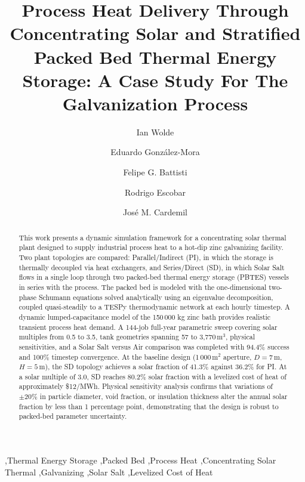 \documentclass[11pt,review,3p]{elsarticle}
\begin{document}
\begin{frontmatter}

\title{Process Heat Delivery Through Concentrating Solar and Stratified Packed Bed Thermal Energy Storage: A Case Study For The Galvanization Process}

\author[PUC]{Ian Wolde}
\author[UTFSM]{Eduardo González-Mora}
\author[UTEM]{Felipe G. Battisti}
\author[PUC]{Rodrigo Escobar}
\author[PUC,SERC,CDA]{José M. Cardemil}



\begin{abstract}
This work presents a dynamic simulation framework for a concentrating solar thermal plant designed to supply industrial process heat to a hot-dip zinc galvanizing facility. Two plant topologies are compared: Parallel/Indirect (PI), in which the storage is thermally decoupled via heat exchangers, and Series/Direct (SD), in which Solar Salt flows in a single loop through two packed-bed thermal energy storage (PBTES) vessels in series with the process. The packed bed is modeled with the one-dimensional two-phase Schumann equations solved analytically using an eigenvalue decomposition, coupled quasi-steadily to a TESPy thermodynamic network at each hourly timestep. A dynamic lumped-capacitance model of the 150\,000 kg zinc bath provides realistic transient process heat demand. A 144-job full-year parametric sweep covering solar multiples from 0.5 to 3.5, tank geometries spanning 57 to 3{,}770\,m$^3$, physical sensitivities, and a Solar Salt versus Air comparison was completed with 94.4\% success and 100\% timestep convergence. At the baseline design (1\,000\,m$^2$ aperture, $D=7$\,m, $H=5$\,m), the SD topology achieves a solar fraction of 41.3\% against 36.2\% for PI. At a solar multiple of 3.0, SD reaches 80.2\% solar fraction with a levelized cost of heat of approximately \$12/MWh. Physical sensitivity analysis confirms that variations of $\pm20\%$ in particle diameter, void fraction, or insulation thickness alter the annual solar fraction by less than 1 percentage point, demonstrating that the design is robust to packed-bed parameter uncertainty.
\end{abstract}

\begin{keyword}
\sep Thermal Energy Storage \sep Packed Bed \sep Process Heat \sep Concentrating Solar Thermal \sep Galvanizing \sep Solar Salt \sep Levelized Cost of Heat
\end{keyword}

\end{frontmatter}
\end{document}
